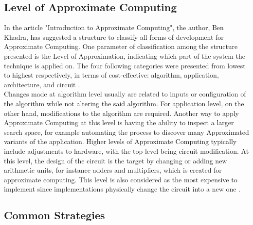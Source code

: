 \subsection{Level of Approximate Computing}
In the article "Introduction to Approximate Computing", the author, Ben Khadra, has suggested a structure to classify all forms of development for Approximate Computing. One parameter of classification among the structure presented is the Level of Approximation, indicating which part of the system the technique is applied on. The four following categories were presented from lowest to highest respectively, in terms of cost-effective: algorithm, application, architecture, and circuit \cite{introAxC}. \\
Changes made at algorithm level usually are related to inputs or configuration of the algorithm while not altering the said algorithm. For application level, on the other hand, modifications to the algorithm are required. Another way to apply Approximate Computing at this level is having the ability to inspect a larger search space, for example automating the process to discover many Approximated variants of the application. Higher levels of Approximate Computing typically include adjustments to hardware, with the top-level being circuit modification. At this level, the design of the circuit is the target by changing or adding new arithmetic units, for instance adders and multipliers, which is created for approximate computing. This level is also considered as the most expensive to implement since implementations physically change the circuit into a new one \cite{introAxC}.
\subsection{Common Strategies}


